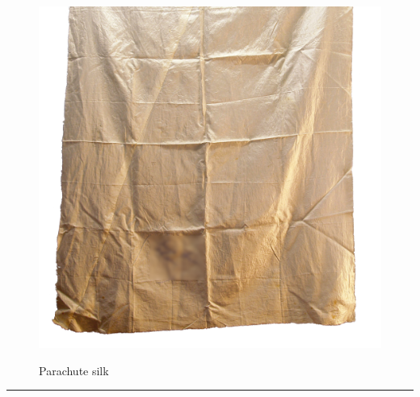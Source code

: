 \documentclass{article}
\begin{document}
    \begin{figure}[H]
        \centering
        \begin{minipage}{0.25\textwidth}
            \centering
            \includegraphics[width=\textwidth]{../SurvivalItemImages/silk}
        \end{minipage}\hfill
        \begin{minipage}{0.7\textwidth}
            \centering
            \Large Parachute silk
        \end{minipage}
    \end{figure}
    \vspace{-0.8em}
    \noindent\rule{\textwidth}{0.4pt}
            
    \clearpage
\end{document}
